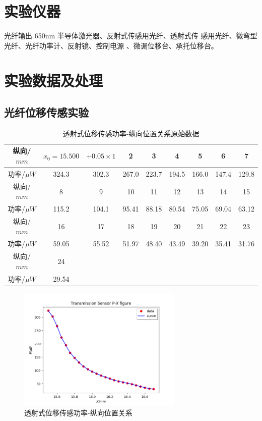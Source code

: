 \documentclass[a4paper,UTF8]{ctexart}
\begin{document}
\section{实验仪器}

光纤输出 650nm 半导体激光器、反射式传感用光纤、透射式传
感用光纤、微弯型光纤、光纤功率计、反射镜、控制电源
、微调位移台、承托位移台。

\section{实验数据及处理}

\subsection{光纤位移传感实验}

\begin{table}[H]
    \centering
    \begin{tabular}{|c|c|c|c|c|c|c|c|c|}
    \hline
        纵向/$mm$ & $x_0 = 15.500$ & $+0.05 \times 1$ & 2 & 3 & 4 & 5 & 6 & 7 \\ \hline
        功率/$\mu W$ & 324.3 & 302.3 & 267.0 & 223.7 & 194.5 & 166.0 & 147.4 & 129.8 \\ \hline
        纵向/$mm$ & 8 & 9 & 10 & 11 & 12 & 13 & 14 & 15 \\ \hline
        功率/$\mu W$ & 115.2 & 104.1 & 95.41 & 88.18 & 80.54 & 75.05 & 69.04 & 63.12 \\ \hline
        纵向/$mm$ & 16 & 17 & 18 & 19 & 20 & 21 & 22 & 23 \\ \hline
        功率/$\mu W$ & 59.05 & 55.52 & 51.97 & 48.40 & 43.49 & 39.20 & 35.41 & 31.76 \\ \hline
        纵向/$mm$ & 24 & ~ & ~ & ~ & ~ & ~ & ~ & ~ \\ \hline
        功率/$\mu W$ & 29.54 & ~ & ~ & ~ & ~ & ~ & ~ & ~ \\ \hline
    \end{tabular}
    \caption{透射式位移传感功率-纵向位置关系原始数据}
\end{table}

\begin{figure}[H]
    \centering
    \begin{minipage}[b]{0.9\textwidth}
        \centering
        \includegraphics[width=0.7\textwidth]{./one_x.png}
        \caption{透射式位移传感功率-纵向位置关系}
    \end{minipage}
\end{figure}
\end{document}
